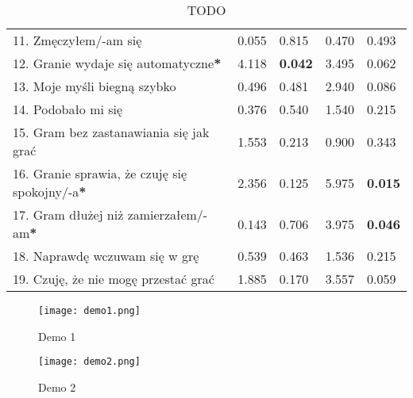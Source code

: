 \begin{table}[h!]
\begin{center}
\begin{tabular}{|m{10em}|m{5em}|m{5em}|m{5em}|m{5em}|}
            11. Zmęczyłem/-am się                                             & 0.055                       & 0.815            & 0.470                   & 0.493          \\
            12. Granie wydaje się automatyczne\textbf{*}                      & 4.118                       & \textbf{0.042}   & 3.495                   & 0.062          \\
            13. Moje myśli \newline biegną szybko                             & 0.496                       & 0.481            & 2.940                   & 0.086          \\
            14. Podobało mi się                                               & 0.376                       & 0.540            & 1.540                   & 0.215          \\
            15. Gram bez zastanawiania się jak grać                           & 1.553                       & 0.213            & 0.900                   & 0.343          \\
            16. Granie sprawia, \newline że czuję się spokojny/-a\textbf{*}   & 2.356                       & 0.125            & 5.975                   & \textbf{0.015} \\
            17. Gram dłużej \newline niż zamierzałem/-am\textbf{*}            & 0.143                       & 0.706            & 3.975                   & \textbf{0.046} \\
            18. Naprawdę wczuwam się w grę                                    & 0.539                       & 0.463            & 1.536                   & 0.215          \\
            19. Czuję, że nie mogę przestać grać                              & 1.885                       & 0.170            & 3.557                   & 0.059          \\
            \hline
        \end{tabular}
    \end{center}
    \caption{TODO}\label{tab1:ch7_15}
\end{table}

\begin{figure}[h!]
    \centering
    \texttt{[image: demo1.png]}
    \caption{Demo 1}
    \label{fig:ch7_demo1}
\end{figure}

\begin{figure}[h!]
    \centering
    \texttt{[image: demo2.png]}
    \caption{Demo 2}
    \label{fig:ch7_demo2}
\end{figure}

